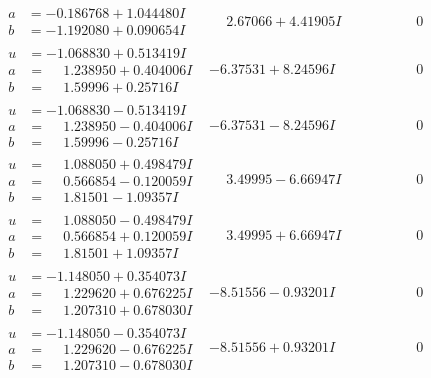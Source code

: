 \documentclass[1p]{elsarticle_modified}
\theoremstyle{definition}
\begin{document}
$$\begin{array}{c|c|c}
\begin{aligned}
a &= -0.186768 + 1.044480 I \\
b &= -1.192080 + 0.090654 I\end{aligned}
 & \phantom{-}2.67066 + 4.41905 I & \phantom{-0.000000 } 0 \\ \hline\begin{aligned}
u &= -1.068830 + 0.513419 I \\
a &= \phantom{-}1.238950 + 0.404006 I \\
b &= \phantom{-}1.59996 + 0.25716 I\end{aligned}
 & -6.37531 + 8.24596 I & \phantom{-0.000000 } 0 \\ \hline\begin{aligned}
u &= -1.068830 - 0.513419 I \\
a &= \phantom{-}1.238950 - 0.404006 I \\
b &= \phantom{-}1.59996 - 0.25716 I\end{aligned}
 & -6.37531 - 8.24596 I & \phantom{-0.000000 } 0 \\ \hline\begin{aligned}
u &= \phantom{-}1.088050 + 0.498479 I \\
a &= \phantom{-}0.566854 - 0.120059 I \\
b &= \phantom{-}1.81501 - 1.09357 I\end{aligned}
 & \phantom{-}3.49995 - 6.66947 I & \phantom{-0.000000 } 0 \\ \hline\begin{aligned}
u &= \phantom{-}1.088050 - 0.498479 I \\
a &= \phantom{-}0.566854 + 0.120059 I \\
b &= \phantom{-}1.81501 + 1.09357 I\end{aligned}
 & \phantom{-}3.49995 + 6.66947 I & \phantom{-0.000000 } 0 \\ \hline\begin{aligned}
u &= -1.148050 + 0.354073 I \\
a &= \phantom{-}1.229620 + 0.676225 I \\
b &= \phantom{-}1.207310 + 0.678030 I\end{aligned}
 & -8.51556 - 0.93201 I & \phantom{-0.000000 } 0 \\ \hline\begin{aligned}
u &= -1.148050 - 0.354073 I \\
a &= \phantom{-}1.229620 - 0.676225 I \\
b &= \phantom{-}1.207310 - 0.678030 I\end{aligned}
 & -8.51556 + 0.93201 I & \phantom{-0.000000 } 0 \\ \hline\begin{aligned}

\end{aligned}
\end{array}$$
\end{document}
